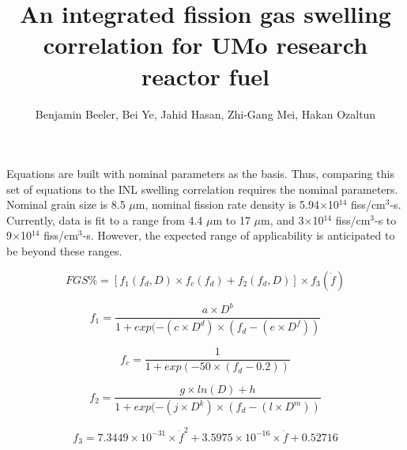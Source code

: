 \documentclass[11pt, oneside]{article}   	%
\title{An integrated fission gas swelling correlation for UMo research reactor fuel}
\author{Benjamin Beeler, Bei Ye, Jahid Hasan, Zhi-Gang Mei, Hakan Ozaltun}
\date{}							%
\begin{document}
\maketitle

Equations are built with nominal parameters as the basis. Thus, comparing this set of equations to the INL swelling correlation requires the nominal parameters. Nominal grain size is 8.5 $\mu$m, nominal fission rate density is 5.94$\times$10$^{14}$ fiss/cm$^3$-s. Currently, data is fit to a range from 4.4 $\mu$m to 17 $\mu$m, and 3$\times$10$^{14}$ fiss/cm$^3$-s to 9$\times$10$^{14}$ fiss/cm$^3$-s. However, the expected range of applicability is anticipated to be beyond these ranges. 

\begin{equation}
\label{eq:FGS}
FGS\% = [f_1(f_d,D)\times f_c(f_d) + f_2(f_d,D)]\times f_3(\dot{f})
\end{equation}

\begin{equation}
\label{eq:f1}
f_1 = \frac{a\times D^b}{1+ exp(-(c\times D^d)\times (f_d - (e\times D^f))}
\end{equation}

\begin{equation}
\label{eq:fc}
f_c = \frac{1}{1+ exp(-50\times (f_d - 0.2 ))}
\end{equation}

\begin{equation}
\label{eq:f2}
f_2 = \frac{g\times ln(D) + h}{1+ exp(-(j\times D^k)\times (f_d - (l\times D^m))}
\end{equation}

\begin{equation}
\label{eq:fdot}
f_3 = 7.3449 \times 10^{-31} \times \dot{f}^2 + 3.5975 \times 10^{-16} \times \dot{f} + 0.52716
\end{equation}
\end{document}
